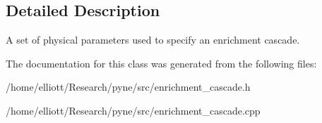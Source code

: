 \subsection{Detailed Description}
A set of physical parameters used to specify an enrichment cascade. 

The documentation for this class was generated from the following files\-:\begin{DoxyCompactItemize}
\item 
/home/elliott/\-Research/pyne/src/enrichment\-\_\-cascade.\-h\item 
/home/elliott/\-Research/pyne/src/enrichment\-\_\-cascade.\-cpp\end{DoxyCompactItemize}
